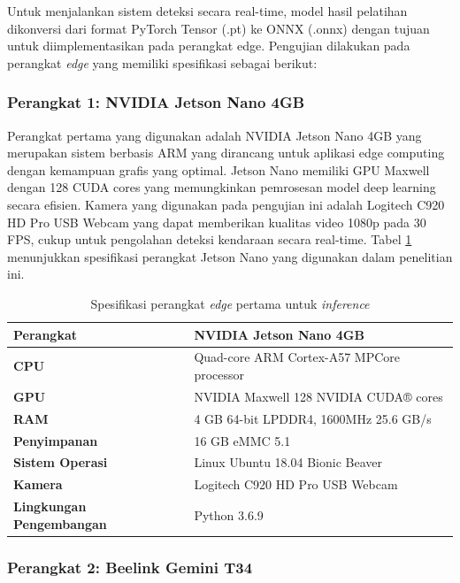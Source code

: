 Untuk menjalankan sistem deteksi secara real-time, model hasil pelatihan dikonversi dari format PyTorch Tensor (.pt) ke ONNX (.onnx) dengan tujuan untuk diimplementasikan pada perangkat edge. Pengujian dilakukan pada perangkat \emph{edge} yang memiliki spesifikasi sebagai berikut:

\subsubsection{Perangkat 1: NVIDIA Jetson Nano 4GB}

Perangkat pertama yang digunakan adalah NVIDIA Jetson Nano 4GB yang merupakan sistem berbasis ARM yang dirancang untuk aplikasi edge computing dengan kemampuan grafis yang optimal. Jetson Nano memiliki GPU Maxwell dengan 128 CUDA cores yang memungkinkan pemrosesan model deep learning secara efisien. Kamera yang digunakan pada pengujian ini adalah Logitech C920 HD Pro USB Webcam yang dapat memberikan kualitas video 1080p pada 30 FPS, cukup untuk pengolahan deteksi kendaraan secara real-time. Tabel \ref{tab:jetson_nano_specs} menunjukkan spesifikasi perangkat Jetson Nano yang digunakan dalam penelitian ini.

\begin{table}[htbp]
  \centering
  \begin{tabular}{|l|l|}
  \hline
  \textbf{Perangkat} & NVIDIA Jetson Nano 4GB \\
  \hline
  \textbf{CPU} & Quad-core ARM Cortex-A57 MPCore processor \\
  \hline
  \textbf{GPU} & NVIDIA Maxwell 128 NVIDIA CUDA® cores \\
  \hline
  \textbf{RAM} & 4 GB 64-bit LPDDR4, 1600MHz 25.6 GB/s \\
  \hline
  \textbf{Penyimpanan} & 16 GB eMMC 5.1 \\
  \hline
  \textbf{Sistem Operasi} & Linux Ubuntu 18.04 Bionic Beaver \\
  \hline
  \textbf{Kamera} & Logitech C920 HD Pro USB Webcam \\
  \hline
  \textbf{Lingkungan Pengembangan} & Python 3.6.9 \\
  \hline
  \end{tabular}
  \caption{Spesifikasi perangkat \emph{edge} pertama untuk \emph{inference}}
  \label{tab:jetson_nano_specs}
\end{table}

\subsubsection{Perangkat 2: Beelink Gemini T34}

